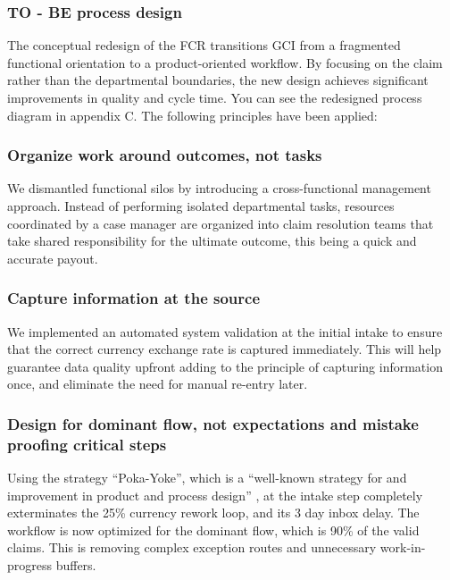 \subsubsection{TO - BE process design}

The conceptual redesign of the FCR transitions GCI from a fragmented functional orientation to a product-oriented workflow. By focusing on the claim rather than the departmental boundaries, the new design achieves significant improvements in quality and cycle time. You can see the redesigned process diagram in appendix C. The following principles have been applied:

\subsubsection{Organize work around outcomes, not tasks}

We dismantled functional silos by introducing a cross-functional management approach. Instead of performing isolated departmental tasks, resources coordinated by a case manager are organized into claim resolution teams that take shared responsibility for the ultimate outcome, this being a quick and accurate payout. 

\subsubsection{Capture information at the source}

We implemented an automated system validation at the initial intake to ensure that the correct currency exchange rate is captured immediately. This will help guarantee data quality upfront adding to the principle of capturing information once, and eliminate the need for manual re-entry later. 

\subsubsection{Design for dominant flow, not expectations and mistake proofing critical steps}

Using the strategy “Poka-Yoke”, which is a “well-known strategy for and
improvement in product and process design” \parencite[p. 99]{laguna2019}, at the intake step completely exterminates the 25\% currency rework loop, and its 3 day inbox delay. The workflow is now optimized for the dominant flow, which is 90\% of the valid claims. This is removing complex exception routes and unnecessary work-in-progress buffers. 

